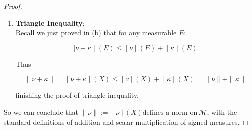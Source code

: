 \begin{proof}
\begin{enumerate}
  We have:

  \[\left. \parallel a\nu \parallel = \middle| a\nu \middle| (X) = \middle| a \middle| \cdot \middle| \nu \middle| (X) = \middle| a \middle| \cdot \parallel \nu \parallel \right.\]

  finishing the proof of absolute homogeneity.
\item
  \textbf{Triangle Inequality}:\\
  Recall we just proved in (b) that for any measurable \(E\):

  \[\left. |\nu + \kappa \middle| (E) \leq \middle| \nu \middle| (E) + \middle| \kappa \middle| (E) \right.\]

  Thus

  \[\left. \parallel \nu + \kappa \parallel = \middle| \nu + \kappa \middle| (X) \leq \middle| \nu \middle| (X) + \middle| \kappa \middle| (X) = \parallel \nu \parallel + \parallel \kappa \parallel \right.\]

  finishing the proof of triangle inequality.\\
\end{enumerate}

So we can conclude that \(\left. \parallel \nu \parallel := \middle| \nu \middle| (X)\text{defines a norm on}\ \mathcal{M} \right.\), with the standard definitions of addition and scalar multiplication of signed measures.

\end{proof}

